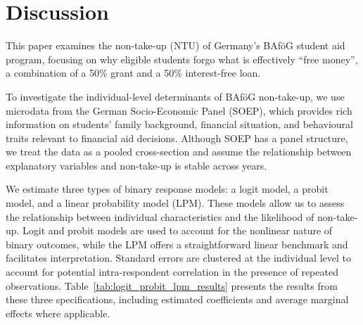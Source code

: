 \section{Discussion}
%
%
This paper examines the non-take-up (NTU) of Germany’s BAföG student aid program, focusing on why eligible students forgo what is effectively ``free money'', a combination of a 50\% grant and a 50\% interest-free loan.

To investigate the individual-level determinants of BAföG non-take-up, we use microdata from the German Socio-Economic Panel (SOEP), which provides rich information on students' family background, financial situation, and behavioural traits relevant to financial aid decisions. 
Although SOEP has a panel structure, we treat the data as a pooled cross-section and assume the relationship between explanatory variables and non-take-up is stable across years.

We estimate three types of binary response models: a logit model, a probit model, and a linear probability model (LPM). 
These models allow us to assess the relationship between individual characteristics and the likelihood of non-take-up. 
Logit and probit models are used to account for the nonlinear nature of binary outcomes, while the LPM offers a straightforward linear benchmark and facilitates interpretation. 
Standard errors are clustered at the individual level to account for potential intra-respondent correlation in the presence of repeated observations. 
Table~\ref{tab:logit_probit_lpm_results} presents the results from these three specifications, including estimated coefficients and average marginal effects where applicable.


%
%

%
%

%
%

%
%

%
%

%
%
